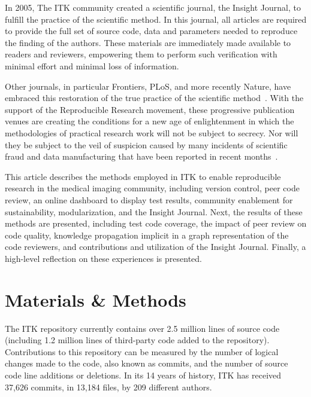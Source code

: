 \documentclass{frontiersENG} %
\begin{document}
In 2005, The ITK community created a scientific journal, the Insight Journal,
to fulfill the practice of the scientific method.  In this journal, all
articles are required to provide the full set of source code, data and
parameters needed to reproduce the finding of the authors. These materials are
immediately made available to readers and reviewers, empowering them to
perform such verification with minimal effort and minimal loss of information.

Other journals, in particular Frontiers, PLoS, and more recently Nature, have
embraced this restoration of the true practice of the scientific
method~\cite{Stodden2013,NatureEditorial2013,NatureEditorial2012}.  With the
support of the Reproducible Research movement, these progressive publication
venues are creating the conditions for a new age of enlightenment in which the
methodologies of practical research work will not be subject to secrecy. Nor
will they be subject to the veil of suspicion caused by many incidents of scientific fraud and
data manufacturing that have been reported in recent
months~\cite{Sandve2013,Mobley2013,Begley2012}.

%
%

This article describes the methods employed in ITK to enable reproducible
research in the medical imaging community, including version control, peer code
review, an online dashboard to display test results, community enablement for
sustainability, modularization, and the Insight Journal.  Next, the results of
these methods are presented, including test code coverage, the impact of peer
review on code quality, knowledge propagation implicit in a graph
representation of the code reviewers, and contributions and utilization of the
Insight Journal.  Finally, a high-level reflection on these experiences is
presented.



\section{Materials \& Methods}

The ITK repository currently contains over 2.5 million lines of source code
(including 1.2 million lines of third-party code added to the repository).
Contributions to this repository can be measured by the number of logical
changes made to the code, also known as commits, and the number of source code
line additions or deletions. In its 14 years of history, ITK has received
37,626 commits, in 13,184 files, by 209 different authors.
\end{document}
